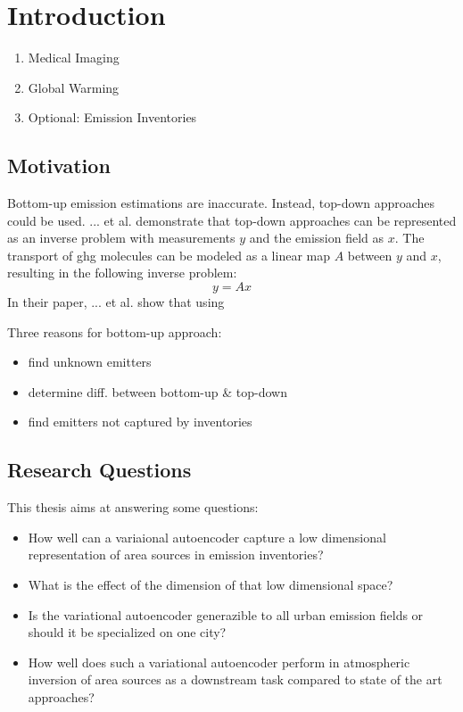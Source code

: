 
\chapter{Introduction}\label{chapter:introduction}

\begin{enumerate}
	\item Medical Imaging
	\item Global Warming
	\item Optional: Emission Inventories
\end{enumerate}

\section{Motivation}
Bottom-up emission estimations are inaccurate.
Instead, top-down approaches could be used.
... et al. demonstrate that top-down approaches can be represented as an inverse problem with measurements $y$ and the emission field as $x$.
The transport of ghg molecules can be modeled as a linear map $A$ between $y$ and $x$, resulting in the following inverse problem:
\begin{equation}
	y = Ax
\end{equation}
In their paper, ... et al. show that using

Three reasons for bottom-up approach:
\begin{itemize}
	\item find unknown emitters
	\item determine diff. between bottom-up \& top-down
	\item find emitters not captured by inventories
\end{itemize}

\section{Research Questions}
This thesis aims at answering some questions:

\begin{itemize}
	\item How well can a variaional autoencoder capture a low dimensional representation of area sources in emission inventories?
	\item What is the effect of the dimension of that low dimensional space?
	\item Is the variational autoencoder generazible to all urban emission fields or should it be specialized on one city?
	\item How well does such a variational autoencoder perform in atmospheric inversion of area sources as a downstream task compared to state of the art approaches?
\end{itemize}
